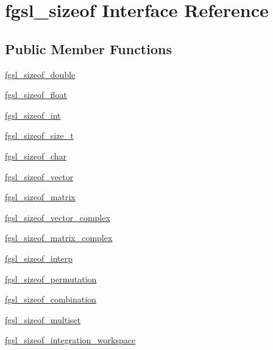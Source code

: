 \hypertarget{interfacefgsl__sizeof}{\section{fgsl\-\_\-sizeof Interface Reference}
\label{interfacefgsl__sizeof}
}
\subsection*{Public Member Functions}
\begin{DoxyCompactItemize}
\item 
\hyperlink{interfacefgsl__sizeof_a09dcf0ba3c399bf4180e068fcc51411b}{fgsl\-\_\-sizeof\-\_\-double}
\item 
\hyperlink{interfacefgsl__sizeof_a7936cc803801f8937a2d40c7aa833cfc}{fgsl\-\_\-sizeof\-\_\-float}
\item 
\hyperlink{interfacefgsl__sizeof_a333c65a82acaa67a814b9b6e09882a17}{fgsl\-\_\-sizeof\-\_\-int}
\item 
\hyperlink{interfacefgsl__sizeof_a6586ee7f0da543a3c7fe825a2f93c1ed}{fgsl\-\_\-sizeof\-\_\-size\-\_\-t}
\item 
\hyperlink{interfacefgsl__sizeof_a357f3f65f86d535f570769027a727b4e}{fgsl\-\_\-sizeof\-\_\-char}
\item 
\hyperlink{interfacefgsl__sizeof_afaff3b5eb24e4ccbe72031bdfa91e14f}{fgsl\-\_\-sizeof\-\_\-vector}
\item 
\hyperlink{interfacefgsl__sizeof_aa0a1ae56e5ae76ebd04c2b39ea8def4e}{fgsl\-\_\-sizeof\-\_\-matrix}
\item 
\hyperlink{interfacefgsl__sizeof_a4ba7154a64a65acbd3f7c97be257cb40}{fgsl\-\_\-sizeof\-\_\-vector\-\_\-complex}
\item 
\hyperlink{interfacefgsl__sizeof_a19e97a760e18face06868c597950f7c3}{fgsl\-\_\-sizeof\-\_\-matrix\-\_\-complex}
\item 
\hyperlink{interfacefgsl__sizeof_a1f6b503a6666f577ef97b17b715ad66a}{fgsl\-\_\-sizeof\-\_\-interp}
\item 
\hyperlink{interfacefgsl__sizeof_a6c1ac48c8524f61d28d906460ab9069c}{fgsl\-\_\-sizeof\-\_\-permutation}
\item 
\hyperlink{interfacefgsl__sizeof_a9ec0415509f4a420702f70eee66b0307}{fgsl\-\_\-sizeof\-\_\-combination}
\item 
\hyperlink{interfacefgsl__sizeof_a669cd8ded29c87b3649014de8ef5bb10}{fgsl\-\_\-sizeof\-\_\-multiset}
\item 
\hyperlink{interfacefgsl__sizeof_a58c8a6d2b7550b2ee309768abc134f70}{fgsl\-\_\-sizeof\-\_\-integration\-\_\-workspace}

\end{DoxyCompactItemize}
